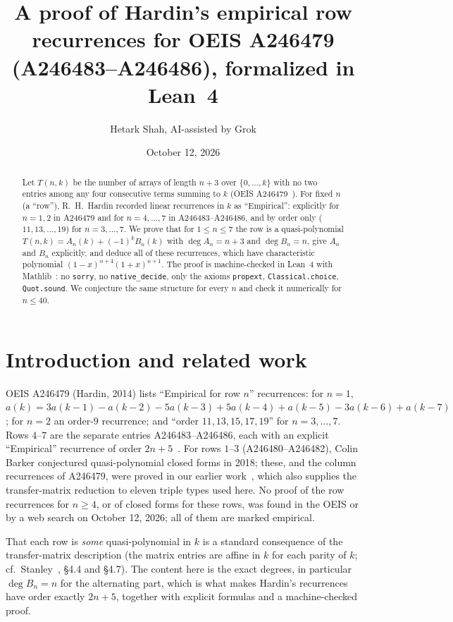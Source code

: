 \documentclass[11pt]{article}
\author{Hetark Shah, AI-assisted by Grok}
\date{October 12, 2026}
\title{A proof of Hardin's empirical row recurrences for OEIS A246479 (A246483--A246486), formalized in Lean~4}
\theoremstyle{remark}\newtheorem{remark}[theorem]{Remark}
\begin{document}
\maketitle

\begin{abstract}
Let $T(n,k)$ be the number of arrays of length $n+3$ over $\{0,\dots,k\}$ with no two entries among any four consecutive terms summing to $k$ (OEIS A246479~\cite{oeis}). For fixed $n$ (a ``row''), R.~H.~Hardin recorded linear recurrences in $k$ as ``Empirical'': explicitly for $n=1,2$ in A246479 and for $n=4,\dots,7$ in A246483--A246486, and by order only ($11,13,\dots,19$) for $n=3,\dots,7$. We prove that for $1\le n\le 7$ the row is a quasi-polynomial $T(n,k)=A_n(k)+(-1)^kB_n(k)$ with $\deg A_n=n+3$ and $\deg B_n=n$, give $A_n$ and $B_n$ explicitly, and deduce all of these recurrences, which have characteristic polynomial $(1-x)^{n+4}(1+x)^{n+1}$. The proof is machine-checked in Lean~4 with Mathlib~\cite{mathlib}: no \texttt{sorry}, no \texttt{native\_decide}, only the axioms \texttt{propext}, \texttt{Classical.choice}, \texttt{Quot.sound}. We conjecture the same structure for every $n$ and check it numerically for $n\le 40$.
\end{abstract}

\section{Introduction and related work}
OEIS A246479 (Hardin, 2014) lists ``Empirical for row $n$'' recurrences: for $n=1$, $a(k)=3a(k-1)-a(k-2)-5a(k-3)+5a(k-4)+a(k-5)-3a(k-6)+a(k-7)$; for $n=2$ an order-$9$ recurrence; and ``order $11,13,15,17,19$'' for $n=3,\dots,7$. Rows $4$--$7$ are the separate entries A246483--A246486, each with an explicit ``Empirical'' recurrence of order $2n+5$~\cite{oeisrows}. For rows $1$--$3$ (A246480--A246482), Colin Barker conjectured quasi-polynomial closed forms in 2018; these, and the column recurrences of A246479, were proved in our earlier work~\cite{a246479}, which also supplies the transfer-matrix reduction to eleven triple types used here. No proof of the row recurrences for $n\ge4$, or of closed forms for these rows, was found in the OEIS or by a web search on October 12, 2026; all of them are marked empirical.

That each row is \emph{some} quasi-polynomial in $k$ is a standard consequence of the transfer-matrix description (the matrix entries are affine in $k$ for each parity of $k$; cf.\ Stanley~\cite{stanley}, \S4.4 and \S4.7). The content here is the exact degrees, in particular $\deg B_n=n$ for the alternating part, which is what makes Hardin's recurrences have order exactly $2n+5$, together with explicit formulas and a machine-checked proof.
\end{document}
